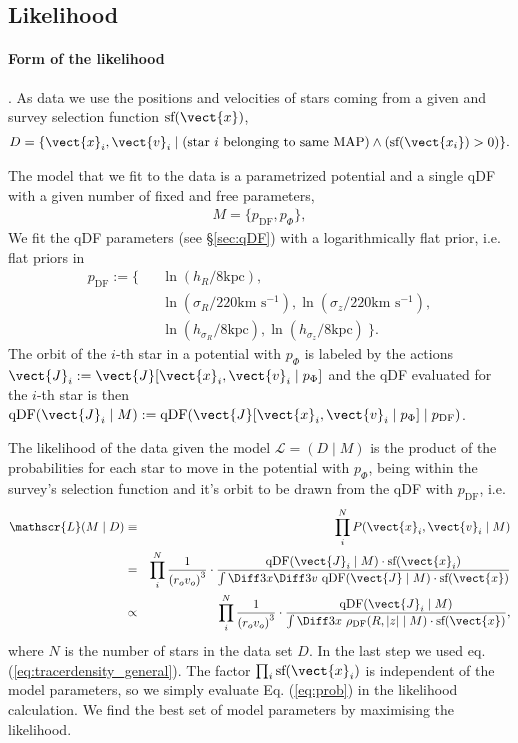 \subsection{Likelihood}

\paragraph{Form of the likelihood}. As data we use the positions and velocities of stars coming from a given \MAP and survey selection function $\text{sf}(\vect{x})$,
\begin{eqnarray*}
D  =\{ \vect{x}_i,\vect{v}_i \mid \text{(star $i$ belonging to same MAP)} \wedge (\text{sf}(\vect{x_i}) > 0) \}.
\end{eqnarray*}

The model that we fit to the data is a parametrized potential and a single qDF with a given number of fixed and free parameters,
\begin{eqnarray*}
M =\{ p_\text{DF} , p_\Phi \},
\end{eqnarray*}
We fit the qDF parameters (see \S\ref{sec:qDF}) with a logarithmically flat prior, i.e. flat priors in
\begin{eqnarray*}
p_\text{DF} := \{&& \ln \left(h_R/8\text{kpc}\right), \\
&& \ln \left(\sigma_R/220\text{km s$^{-1}$}\right), \ln \left(\sigma_z/220\text{km s$^{-1}$}\right), \\
&& \ln \left(h_{\sigma_R}/8\text{kpc}\right), \ln \left(h_{\sigma_z}/8\text{kpc}\right)\ \}.
\end{eqnarray*}
The orbit of the $i$-th star in a potential with $p_\Phi$ is labeled by the actions $\vect{J}_i := \vect{J}[\vect{x}_i,\vect{v}_i\mid p_{\Phi}]$ and the qDF evaluated for the $i$-th star is then $\text{qDF}(\vect{J}_i \mid M) := \text{qDF}(\vect{J}[\vect{x}_i,\vect{v}_i\mid p_{\Phi}] \mid p_\text{DF})$.

The likelihood of the data given the model $\mathscr{L} = (D \mid M)$ is the product of the probabilities for each star to move in the potential with $p_\Phi$, being within the survey's selection function and it's orbit to be drawn from the qDF with $p_\text{DF}$, i.e. 
\begin{eqnarray}
\mathscr{L}(M \mid D) &\equiv& \prod_i^{N} P(\vect{x}_i,\vect{v}_i \mid M) \nonumber\\
&=& \prod_i^{N} \frac{1}{\left(r_o v_o\right)^3} \cdot \frac{\text{qDF}(\vect{J}_i \mid M) \cdot \text{sf}(\vect{x}_i)}{\int \Diff 3 x \Diff 3 v \  \text{qDF}(\vect{J} \mid M) \cdot \text{sf}(\vect{x})}\nonumber\\
&\propto& \prod_i^{N} \frac{1}{\left(r_o v_o\right)^3} \cdot \frac{\text{qDF}(\vect{J}_i \mid M)}{\int \Diff 3 x \  \rho_\text{DF}(R,|z| \mid M) \cdot \text{sf}(\vect{x})}, \label{eq:prob}
\end{eqnarray}
where $N$ is the number of stars in the data set $D$.
In the last step we used eq. (\ref{eq:tracerdensity_general}). The factor $\prod_i\text{sf}(\vect{x}_i)$ is independent of the model parameters, so we  simply evaluate Eq. (\ref{eq:prob}) in the likelihood calculation. We find the best set of model parameters by maximising the likelihood. 


